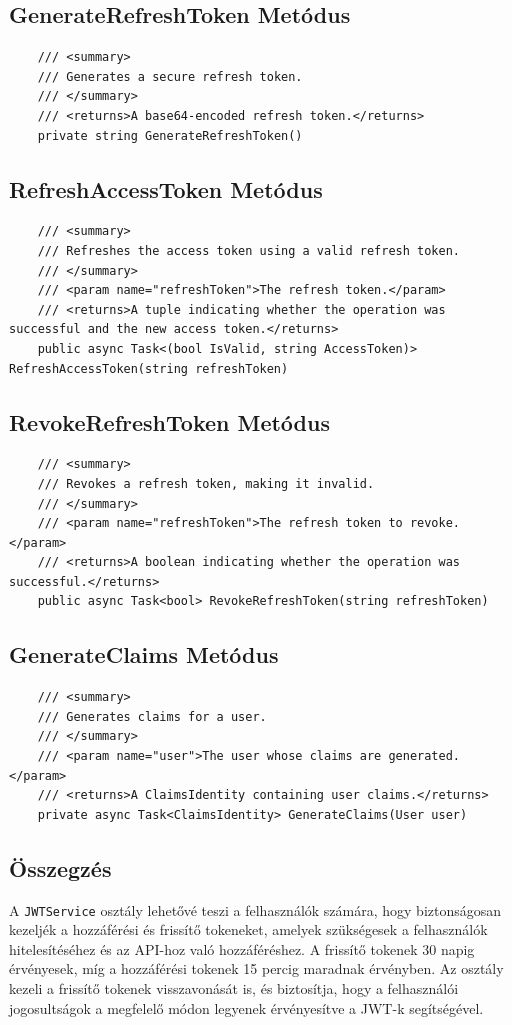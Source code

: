 \documentclass{report}[11pt]
\begin{document}
\subsection*{GenerateRefreshToken Metódus}
\begin{lstlisting}
    /// <summary>
    /// Generates a secure refresh token.
    /// </summary>
    /// <returns>A base64-encoded refresh token.</returns>
    private string GenerateRefreshToken()
\end{lstlisting}

\subsection*{RefreshAccessToken Metódus}
\begin{lstlisting}
    /// <summary>
    /// Refreshes the access token using a valid refresh token.
    /// </summary>
    /// <param name="refreshToken">The refresh token.</param>
    /// <returns>A tuple indicating whether the operation was successful and the new access token.</returns>
    public async Task<(bool IsValid, string AccessToken)> RefreshAccessToken(string refreshToken)
\end{lstlisting}

\subsection*{RevokeRefreshToken Metódus}
\begin{lstlisting}
    /// <summary>
    /// Revokes a refresh token, making it invalid.
    /// </summary>
    /// <param name="refreshToken">The refresh token to revoke.</param>
    /// <returns>A boolean indicating whether the operation was successful.</returns>
    public async Task<bool> RevokeRefreshToken(string refreshToken)
\end{lstlisting}

\subsection*{GenerateClaims Metódus}
\begin{lstlisting}
    /// <summary>
    /// Generates claims for a user.
    /// </summary>
    /// <param name="user">The user whose claims are generated.</param>
    /// <returns>A ClaimsIdentity containing user claims.</returns>
    private async Task<ClaimsIdentity> GenerateClaims(User user)
\end{lstlisting}

\subsection*{Összegzés}
A \texttt{JWTService} osztály lehetővé teszi a felhasználók számára, hogy biztonságosan kezeljék a hozzáférési és frissítő tokeneket, amelyek szükségesek a felhasználók hitelesítéséhez és az API-hoz való hozzáféréshez. A frissítő tokenek 30 napig érvényesek, míg a hozzáférési tokenek 15 percig maradnak érvényben. Az osztály kezeli a frissítő tokenek visszavonását is, és biztosítja, hogy a felhasználói jogosultságok a megfelelő módon legyenek érvényesítve a JWT-k segítségével.
\end{document}
